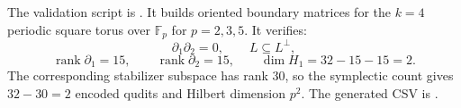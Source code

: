 The validation script is
. It builds
oriented boundary matrices for the \(k=4\) periodic square torus over
\(\mathbb F_p\) for \(p=2,3,5\). It
verifies:
\[
  \partial_1\partial_2=0,\qquad L\subseteq L^\perp,
\]
\[
  \operatorname{rank}\partial_1=15,\qquad
  \operatorname{rank}\partial_2=15,\qquad
  \dim H_1=32-15-15=2.
\]
The corresponding stabilizer subspace has rank \(30\), so the symplectic count gives \(32-30=2\) encoded qudits and Hilbert dimension \(p^2\). The generated
CSV is .
